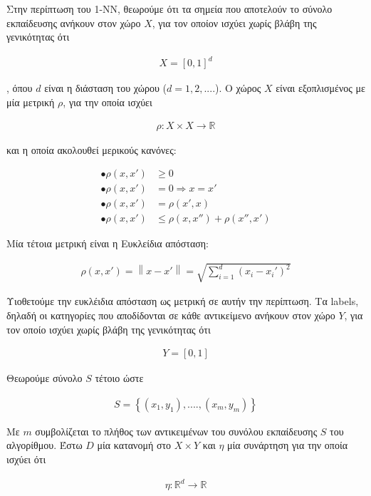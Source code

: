 \documentclass[12pt]{article}
\newcommand{\R}{\mathbb{R}}
\newcommand{\norm}[1]{\left\lVert#1\right\rVert}
\begin{document}
Στην περίπτωση του 1-ΝΝ, θεωρούμε ότι τα σημεία που αποτελούν το σύνολο εκπαίδευσης ανήκουν στον χώρο \(X\), για τον οποίον ισχύει χωρίς βλάβη της γενικότητας ότι 

\begin{align*}
	X = [0,1]^d
\end{align*}

, όπου \(d\) είναι η διάσταση του χώρου (\(d = 1, 2, ....\)). Ο χώρος \(X\) είναι εξοπλισμένος με μία μετρική \(ρ\), για την οποία ισχύει 

\begin{align*}
	ρ:X \times X \rightarrow \R
\end{align*} 

και η οποία  ακολουθεί μερικούς κανόνες:

\begin{align*}
	\bullet ρ(x,x') &\geq 0 \\
	\bullet ρ(x,x') &= 0 \Rightarrow x = x' \\
	\bullet ρ(x,x') &= ρ(x',x) \\
	\bullet ρ(x,x') &\leq ρ(x,x'') + ρ(x'',x')  
\end{align*}

Μία τέτοια μετρική είναι η Ευκλείδια απόσταση:

\begin{align*}
	ρ(x,x') = \norm{x- x'} =\sqrt{\sum_{i=1}^{d}(x_i - x_{i}')^2}
\end{align*}

Υιοθετούμε την ευκλέιδια απόσταση ως μετρική σε αυτήν την περίπτωση. Τα labels, δηλαδή οι κατηγορίες που αποδίδονται σε κάθε αντικείμενο ανήκουν στον χώρο \(Y\), για τον οποίο ισχύει χωρίς βλάβη της γενικότητας ότι 

\begin{align*}
	Y = [0,1]
\end{align*}   


Θεωρούμε σύνολο \(S\) τέτοιο ώστε 

\begin{align*}
	S = \left\{(x_1, y_1), ...., (x_m, y_m)\right\}
\end{align*}

Με \(m\) συμβολίζεται το πλήθος των αντικειμένων του συνόλου εκπαίδευσης \(S\) του αλγορίθμου. Έστω \(D\) μία κατανομή στο \(X \times Y\) και \(η\) μία συνάρτηση για την οποία ισχύει ότι

\begin{align*}
	η: \R^d \rightarrow \R
\end{align*}
\end{document}

